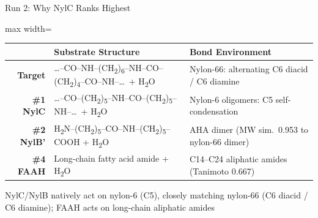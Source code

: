 \documentclass[aspectratio=169, 11pt]{beamer}
\begin{document}
\begin{frame}{Run 2: Why NylC Ranks Highest}
\vspace{-6pt}

{\scriptsize
\begin{adjustbox}{max width=\textwidth}
\begin{tabular}{@{}r p{7.5cm} p{4.0cm}@{}}
\toprule
 & \textbf{Substrate Structure} & \textbf{Bond Environment} \\
\midrule
\rowcolor{accentred!8}
\textbf{Target} & \ldots--CO--NH--(CH\textsubscript{2})\textsubscript{6}--NH--CO--(CH\textsubscript{2})\textsubscript{4}--CO--NH--\ldots\ + H\textsubscript{2}O & Nylon-66: alternating C6 diacid / C6 diamine \\[4pt]
\rowcolor{accentblue!8}
\textbf{\#1 NylC} & \ldots--CO--(CH\textsubscript{2})\textsubscript{5}--NH--CO--(CH\textsubscript{2})\textsubscript{5}--NH--\ldots\ + H\textsubscript{2}O & Nylon-6 oligomers: C5 self-condensation \\[4pt]
\rowcolor{accentorange!8}
\textbf{\#2 NylB'} & H\textsubscript{2}N--(CH\textsubscript{2})\textsubscript{5}--CO--NH--(CH\textsubscript{2})\textsubscript{5}--COOH + H\textsubscript{2}O & AHA dimer (MW sim.\ 0.953 to nylon-66 dimer) \\[4pt]
\rowcolor{accentgreen!8}
\textbf{\#4 FAAH} & Long-chain fatty acid amide + H\textsubscript{2}O & C14--C24 aliphatic amides (Tanimoto 0.667) \\
\bottomrule
\end{tabular}
\end{adjustbox}
}

\vspace{4pt}
{\centering\scriptsize\color{darkgray} NylC/NylB natively act on nylon-6 (C5), closely matching nylon-66 (C6 diacid / C6 diamine); FAAH acts on long-chain aliphatic amides\par}
\vspace{4pt}


\end{frame}
\end{document}
